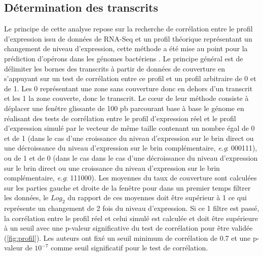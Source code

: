 \documentclass[12pt,a4paper]{report}
\begin{document}
\begin{onehalfspace}
\section*{Détermination des transcrits}
\label{methode_correlation}
Le principe de cette analyse repose sur la recherche de corrélation entre le profil d'expression issu de données de RNA-Seq et un profil théorique représentant un changement de niveau d'expression, cette méthode a été mise au point pour la prédiction d'opérons dans les génomes bactériens \citep{Fortino2014}. Le principe général est de délimiter les bornes des transcrits à partir de données de couverture en s'appuyant sur un test de corrélation entre ce profil et un profil arbitraire de 0 et de 1. Les 0 représentant une zone sans couverture donc en dehors d'un transcrit et les 1 la zone couverte, donc le transcrit. Le cœur de leur méthode consiste à déplacer une fenêtre glissante de 100 pb parcourant base à base le génome en réalisant des tests de corrélation entre le profil d'expression réel et le profil d'expression simulé par le vecteur de même taille contenant un nombre égal de 0 et de 1 (dans le cas d'une croissance du niveau d'expression sur le brin direct ou une décroissance du niveau d'expression sur le brin complémentaire, \textit{e.g}: 000111), ou de 1 et de 0 (dans le cas dans le cas d'une décroissance du niveau d'expression sur le brin direct ou une croissance du niveau d'expression sur le brin complémentaire, \textit{e.g}: 111000). Les moyennes du taux de couverture sont calculées sur les parties gauche et droite de la fenêtre pour dans un premier temps filtrer les données, le $Log_2$ du rapport de ces moyennes doit être supérieur à 1 ce qui représente un changement de 2 fois du niveau d'expression. Si ce 1 filtre est passé, la corrélation entre le profil réel et celui simulé est calculée et doit être supérieure à un seuil avec une p-valeur significative du test de corrélation pour être validée (\autoref{fig:profil}). Les auteurs ont fixé un seuil minimum de corrélation de 0.7 et une p-valeur de $10^{-7}$ comme seuil significatif pour le test de corrélation.

\begin{figure}
\end{figure}


\end{onehalfspace}
\end{document}
